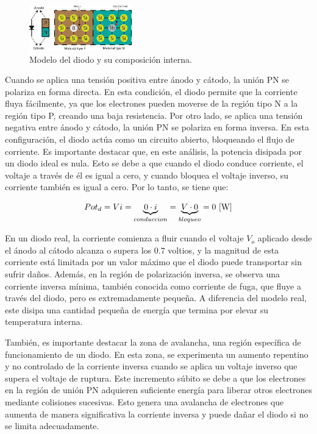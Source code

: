 \documentclass[isoft]{ssltexposter}
\begin{document}
\begin{poster}
\begin{figure}
    \centering
    \includegraphics[width=0.4\textwidth]{imagenes/diodo.eps}
    \caption{Modelo del diodo y su composición interna.}
    \label{fig:diodo}
\end{figure}



Cuando se aplica una tensión positiva entre ánodo y cátodo, la unión PN se polariza en forma directa. En esta condición, el diodo permite que la corriente fluya fácilmente, ya que los electrones pueden moverse de la región tipo N a la región tipo P, creando una baja resistencia. Por otro lado, se aplica una tensión negativa entre ánodo y cátodo, la unión PN se polariza en forma inversa. En esta configuración, el diodo actúa como un circuito abierto, bloqueando  el flujo de corriente. Es importante destacar que, en este análisis, la potencia disipada por un diodo ideal es nula. Esto se debe a que cuando el diodo conduce corriente, el voltaje a través de él es igual a cero, y cuando bloquea el voltaje inverso, su corriente también es igual a cero. Por lo tanto, se tiene que:

\begin{equation*}
    Pot_d= Vi=\underbrace{0\cdot i}_{conduccion}= \underbrace{V\cdot 0}_{bloqueo} = 0 \textup{ [W]} 
\end{equation*}


En un diodo real, la corriente comienza a fluir cuando el voltaje $V_o$ aplicado desde el ánodo al cátodo alcanza o supera los $0.7$  voltios, y la magnitud de esta corriente está limitada por un valor máximo que el diodo puede transportar sin sufrir daños. Además, en la región de polarización inversa, se observa una corriente inversa mínima, también conocida como corriente de fuga, que fluye a través del diodo, pero es extremadamente pequeña. A diferencia del modelo real, este disipa una cantidad pequeña de energía que termina por elevar su temperatura interna. 

También, es importante destacar la zona de avalancha, una región específica de funcionamiento de un diodo. En esta zona, se experimenta un aumento repentino y no controlado de la corriente inversa cuando se aplica un voltaje inverso que supera el voltaje de ruptura. Este incremento súbito se debe a que los electrones en la región de unión PN adquieren suficiente energía para liberar otros electrones mediante colisiones sucesivas. Esto genera una avalancha de electrones que aumenta de manera significativa la corriente inversa y puede dañar el diodo si no se limita adecuadamente.


\end{poster}
\end{document}
